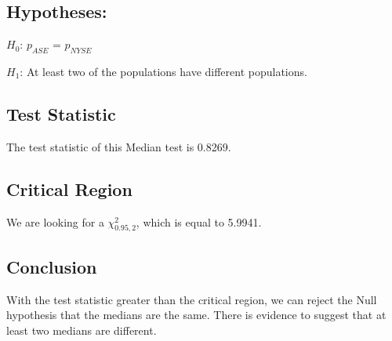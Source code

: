 \documentclass[]{tufte-handout}
\newenvironment{Shaded}{}{}
\newcommand{\KeywordTok}[1]{\textcolor[rgb]{0.00,0.44,0.13}{\textbf{#1}}}
\newcommand{\DataTypeTok}[1]{\textcolor[rgb]{0.56,0.13,0.00}{#1}}
\newcommand{\DecValTok}[1]{\textcolor[rgb]{0.25,0.63,0.44}{#1}}
\newcommand{\StringTok}[1]{\textcolor[rgb]{0.25,0.44,0.63}{#1}}
\newcommand{\OtherTok}[1]{\textcolor[rgb]{0.00,0.44,0.13}{#1}}
\newcommand{\OperatorTok}[1]{\textcolor[rgb]{0.40,0.40,0.40}{#1}}
\newcommand{\NormalTok}[1]{#1}
\begin{document}
\begin{Shaded}
\end{Shaded}

\subsection{Hypotheses:}\label{hypotheses-2}

\(H_{0}\): \(p_{ASE}\) = \(p_{NYSE}\)

\(H_{1}\): At least two of the populations have different populations.

\subsection{Test Statistic}\label{test-statistic-2}

The test statistic of this Median test is 0.8269.

\subsection{Critical Region}\label{critical-region-2}

We are looking for a \(\chi_{0.95, 2}^2\), which is equal to 5.9941.

\subsection{Conclusion}\label{conclusion-2}

With the test statistic greater than the critical region, we can reject
the Null hypothesis that the medians are the same. There is evidence to
suggest that at least two medians are different.
\end{document}
